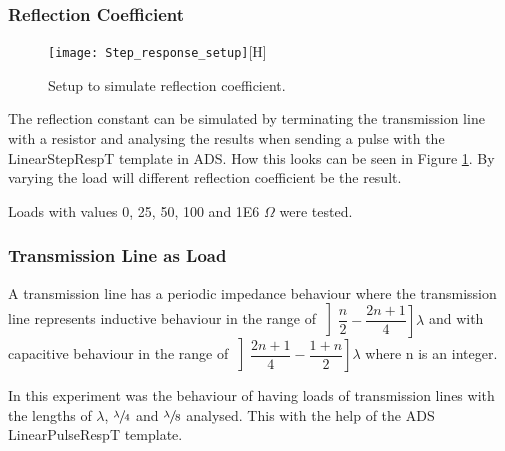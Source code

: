 \documentclass[report.tex]{subfiles}
\begin{document}
\subsubsection{Reflection Coefficient}

\begin{figure}
	\texttt{[image: Step\_response\_setup]}[H]
	\caption{Setup to simulate reflection coefficient.}\label{fig:Lab1 reflection coefficient}
\end{figure}

The reflection constant can be simulated by terminating the transmission line with a resistor and analysing the results when sending a pulse with the LinearStepRespT template in ADS. How this looks can be seen in Figure \ref{fig:Lab1 reflection coefficient}. By varying the load will different reflection coefficient be the result.

Loads with values 0, 25, 50, 100 and 1E6 $\Omega$ were tested.

\subsubsection{Transmission Line as Load}
A transmission line has a periodic impedance behaviour where the transmission line represents inductive behaviour in the range of $\left] \dfrac{n}{2} - \dfrac{2n + 1}{4} \right]\lambda$ and with capacitive behaviour in the range of $\left]\dfrac{2n + 1}{4} - \dfrac{1 + n}{2} \right]\lambda$ where n is an integer.

In this experiment was the behaviour of having loads of transmission lines with the lengths of $\lambda$, $\sfrac{\lambda}{4}$ and $\sfrac{\lambda}{8}$ analysed. This with the help of the ADS LinearPulseRespT template.
\end{document}
